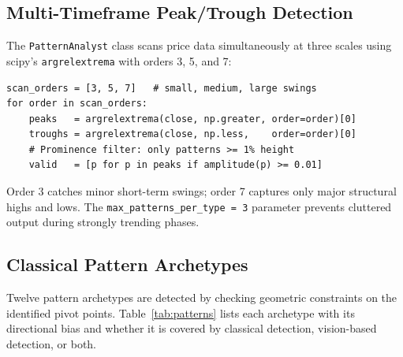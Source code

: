 \documentclass[10pt,a4paper,twoside]{article}
\begin{document}
\subsection{Multi-Timeframe Peak/Trough Detection}

The \texttt{PatternAnalyst} class scans price data simultaneously at three
scales using scipy's \texttt{argrelextrema} with orders 3, 5, and 7:

\begin{lstlisting}[caption={Multi-timeframe peak detection (simplified).}]
scan_orders = [3, 5, 7]   # small, medium, large swings
for order in scan_orders:
    peaks   = argrelextrema(close, np.greater, order=order)[0]
    troughs = argrelextrema(close, np.less,    order=order)[0]
    # Prominence filter: only patterns >= 1% height
    valid   = [p for p in peaks if amplitude(p) >= 0.01]
\end{lstlisting}

Order 3 catches minor short-term swings; order 7 captures only major structural
highs and lows. The \texttt{max\_patterns\_per\_type = 3} parameter prevents
cluttered output during strongly trending phases.

\subsection{Classical Pattern Archetypes}

Twelve pattern archetypes are detected by checking geometric constraints on
the identified pivot points. Table~\ref{tab:patterns} lists each archetype
with its directional bias and whether it is covered by classical detection,
vision-based detection, or both.
\end{document}
